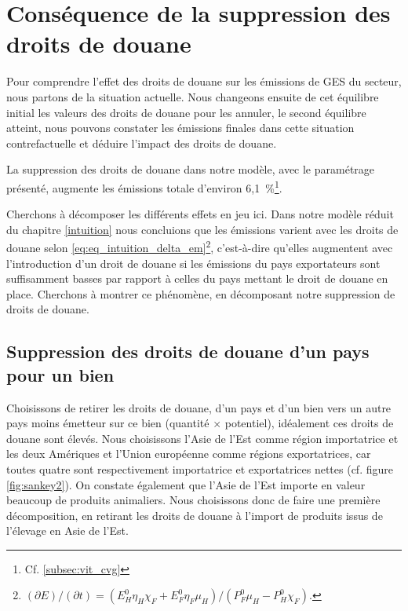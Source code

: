 \section{Conséquence de la suppression des droits de douane}

Pour comprendre l'effet des droits de douane sur les émissions de GES du secteur, nous partons de la situation actuelle. Nous changeons ensuite de cet équilibre initial les valeurs des droits de douane pour les annuler, le second équilibre atteint, nous pouvons constater les émissions finales dans cette situation contrefactuelle et déduire l'impact des droits de douane.

La suppression des droits de douane dans notre modèle, avec le paramétrage présenté, augmente les émissions totale d'environ 6,1~\%\footnote{Cf. \ref{subsec:vit_cvg}}.

Cherchons à décomposer les différents effets en jeu ici. Dans notre modèle réduit du chapitre \ref{intuition} nous concluions que les émissions varient avec les droits de douane selon \ref{eq:eq_intuition_delta_em}\footnote{$\left({\partial E}\right)/\left( {\partial t} \right) = \left( {E_H^0 \eta_H \chi_F + E_F^0 \eta_F \mu_H} \right)/\left( {P_F^0 \mu_H - P_H^0 \chi_F} \right).$}, c'est-à-dire qu'elles augmentent avec l'introduction d'un droit de douane si les émissions du pays exportateurs sont suffisamment basses par rapport à celles du pays mettant le droit de douane en place. Cherchons à montrer ce phénomène, en décomposant notre suppression de droits de douane.

\subsection{Suppression des droits de douane d'un pays pour un bien}\label{subsec:ae_anp}

Choisissons de retirer les droits de douane, d'un pays et d'un bien vers un autre pays moins émetteur sur ce bien (quantité $\times$ potentiel), idéalement ces droits de douane sont élevés. Nous choisissons l'Asie de l'Est comme région importatrice et les deux Amériques et l'Union européenne comme régions exportatrices, car toutes quatre sont respectivement importatrice et exportatrices nettes (cf. figure \ref{fig:sankey2}). On constate également que l'Asie de l'Est importe en valeur beaucoup de produits animaliers. Nous choisissons donc de faire une première décomposition, en retirant les droits de douane à l'import de produits issus de l'élevage en Asie de l'Est.

